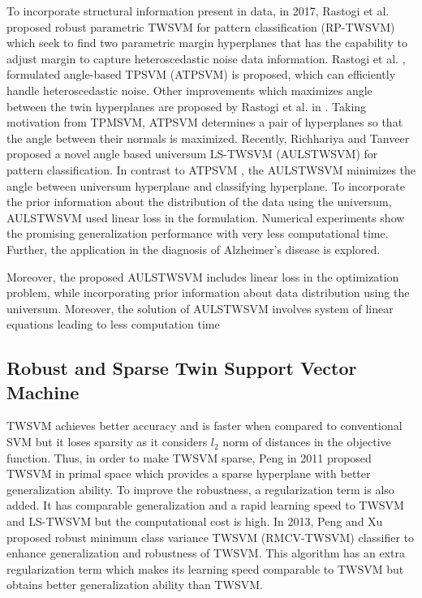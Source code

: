 \documentclass[pdflatex,sn-mathphys]{sn-jnl}%
\theoremstyle{thmstyleone}%
\theoremstyle{thmstyletwo}%
\theoremstyle{thmstylethree}%
\begin{document}
To incorporate structural information present in data, in 2017, Rastogi et al. \cite{rastogi2018robust} proposed robust parametric TWSVM for pattern classification (RP-TWSVM) which seek to find two parametric margin hyperplanes that has the capability to adjust margin to capture heteroscedastic noise data information. Rastogi et al. \cite{rastogi2018anglea},  formulated angle-based TPSVM (ATPSVM) is proposed, which can efficiently handle heteroscedastic noise. Other improvements which maximizes angle between the twin hyperplanes are proposed by Rastogi et al. in \cite{rastogi2018angle}. Taking motivation from TPMSVM, ATPSVM determines a pair of hyperplanes so that the angle between their normals is maximized. Recently, Richhariya and Tanveer proposed a novel angle based universum LS-TWSVM (AULSTWSVM) for pattern classification. In contrast to ATPSVM \cite{rastogi2018angle}, the AULSTWSVM minimizes the angle between universum hyperplane and classifying hyperplane.  To incorporate the prior information about the distribution of the data using the universum, AULSTWSVM used linear loss \cite{shao2015weighted} in the formulation. Numerical experiments show the promising generalization performance with very less computational time. Further, the application in the diagnosis of Alzheimer's disease is explored.

Moreover, the proposed AULSTWSVM includes linear loss \cite{shao2015weighted} in the optimization problem, while incorporating prior information about data distribution using the universum. Moreover, the solution of AULSTWSVM involves system of linear equations leading to less computation time \cite{kumar2009least}


\subsection{Robust and Sparse Twin Support Vector Machine}\noindent
\newline
TWSVM achieves better accuracy and is faster  when compared to conventional SVM but it loses sparsity as it considers $l_2$ norm of distances in the objective function. Thus, in order to make TWSVM sparse, Peng \cite{peng2011building} in 2011 proposed TWSVM in primal space which provides a sparse hyperplane with better generalization ability. To improve the robustness, a regularization term is also added. It has comparable generalization and a rapid learning speed to TWSVM and LS-TWSVM but the computational cost is high. In 2013, Peng and Xu \cite{peng2013robust} proposed robust minimum class variance TWSVM (RMCV-TWSVM) classifier to enhance generalization and robustness of TWSVM. This algorithm has an extra regularization term which makes its learning speed comparable to TWSVM but obtains better generalization ability than TWSVM.
\end{document}
